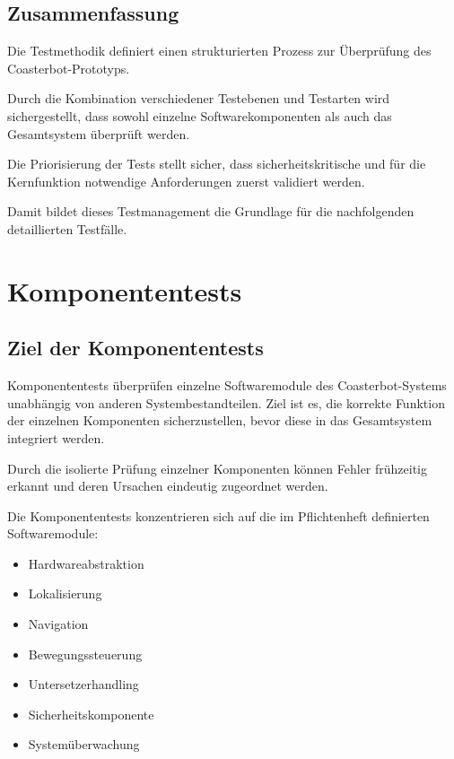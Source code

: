 \subsection{Zusammenfassung}\label{zusammenfassung-1}

Die Testmethodik definiert einen strukturierten Prozess zur Überprüfung
des Coasterbot-Prototyps.

Durch die Kombination verschiedener Testebenen und Testarten wird
sichergestellt, dass sowohl einzelne Softwarekomponenten als auch das
Gesamtsystem überprüft werden.

Die Priorisierung der Tests stellt sicher, dass sicherheitskritische und
für die Kernfunktion notwendige Anforderungen zuerst validiert werden.

Damit bildet dieses Testmanagement die Grundlage für die nachfolgenden
detaillierten Testfälle.

\section{Komponententests}\label{komponententests-1}

\subsection{Ziel der Komponententests}\label{ziel-der-komponententests}

Komponententests überprüfen einzelne Softwaremodule des
Coasterbot-Systems unabhängig von anderen Systembestandteilen. Ziel ist
es, die korrekte Funktion der einzelnen Komponenten sicherzustellen,
bevor diese in das Gesamtsystem integriert werden.

Durch die isolierte Prüfung einzelner Komponenten können Fehler
frühzeitig erkannt und deren Ursachen eindeutig zugeordnet werden.

Die Komponententests konzentrieren sich auf die im Pflichtenheft
definierten Softwaremodule:

\begin{itemize}
\tightlist
\item
  Hardwareabstraktion
\item
  Lokalisierung
\item
  Navigation
\item
  Bewegungssteuerung
\item
  Untersetzerhandling
\item
  Sicherheitskomponente
\item
  Systemüberwachung
\end{itemize}

